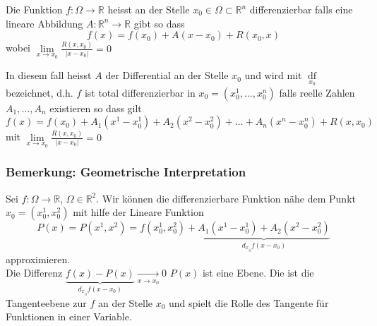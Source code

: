 \begin{definition}{8.4}
Die Funktion $f:\Omega\rightarrow\mathbb{R}$ heisst an der Stelle $x_0\in\Omega\subset\mathbb{R}^n$ differenzierbar falls eine lineare Abbildung $A:\mathbb{R}^n\rightarrow\mathbb{R}$ gibt so dass \[f(x) = f\left( {{x_0}} \right) + A\left( {x - {x_0}} \right) + R\left( {{x_0},x} \right)\] wobei $\mathop {\lim }\limits_{x \to {x_0}} \frac{{R\left( {x,{x_0}} \right)}}{{\left| {x - {x_0}} \right|}} = 0$
\end{definition}
In diesem fall heisst $A$ der Differential an der Stelle $x_0$ und wird mit $\mathop {df}\limits_{{x_0}} $ bezeichnet, d.h. $f$ ist total differenzierbar in $x_0=\left( x_0^1,\dots,x_0^n\right)$ falls reelle Zahlen $A_1,\dots,A_n$ existieren so dass gilt \[f(x) = f\left( {{x_0}} \right) + {A_1}\left( {{x^1} - x_0^1} \right) + {A_2}\left( {{x^2} - x_0^2} \right) +  \ldots  + {A_n}\left( {{x^n} - x_0^n} \right) + R\left( {x,{x_0}} \right)\] mit $\mathop {\lim }\limits_{x \to {x_0}} \frac{{R\left( {x,{x_0}} \right)}}{{\left| {x - {x_0}} \right|}} = 0$

\subsubsection*{Bemerkung: Geometrische Interpretation}
Sei $f:\Omega \rightarrow\mathbb{R}$, $\Omega\in\mathbb{R}^2$. Wir können die differenzierbare Funktion nähe dem Punkt $x_0=\left( x_0^1,x_0^2\right)$ mit hilfe der Lineare Funktion \[P\left( x \right) = P\left( {{x^1},{x^2}} \right) = f\left( {x_0^1,x_0^2} \right) + \underbrace {{A_1}\left( {{x^1} - x_0^1} \right) + {A_2}\left( {{x^2} - x_0^2} \right)}_{{d_x}_{_0}f\left( {x - {x_0}} \right)}\] approximieren. \\

Die Differenz $\underbrace {f(x) - P(x)}_{{d_x}_{_0}f\left( {x - {x_0}} \right)}\mathop  \to \limits_{x \to {x_0}} 0$ $P(x)$ ist eine Ebene. Die ist die Tangenteebene zur $f$ an der Stelle $x_0$ und spielt die Rolle des Tangente für Funktionen in einer Variable. 

